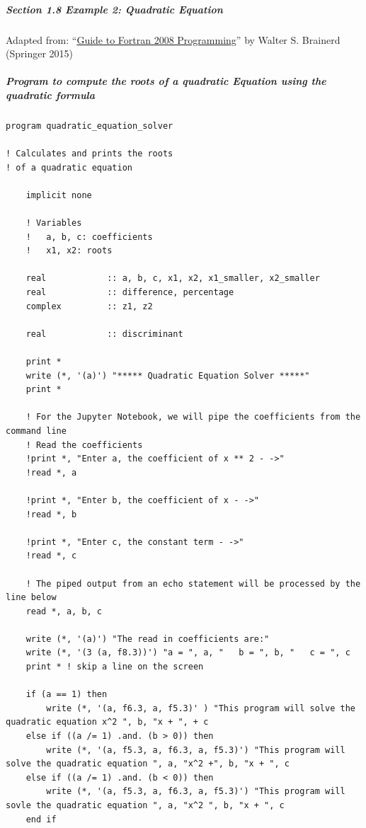 \subparagraph{Section 1.8 Example 2: Quadratic Equation}

Adapted from: ``\href{https://www.amazon.com/Guide-Fortran-Programming-Walter-brainerd/dp/1447167589/ref=sr\_1\_1?crid=JARCJZJ2KJZN\&keywords=guide+to+fortran+2008+programming\&qid=1581908665\&sprefix=guide+to+fortran+2008+programming\%2Caps\%2C189\&sr=8-1}{Guide to Fortran 2008 Programming}'' by Walter S. Brainerd (Springer 2015)

\subparagraph{Program to compute the roots of a quadratic Equation using the quadratic formula}

\begin{verbatim}
program quadratic_equation_solver

! Calculates and prints the roots
! of a quadratic equation

    implicit none

    ! Variables
    !   a, b, c: coefficients
    !   x1, x2: roots

    real            :: a, b, c, x1, x2, x1_smaller, x2_smaller
    real            :: difference, percentage
    complex         :: z1, z2

    real            :: discriminant

    print *
    write (*, '(a)') "***** Quadratic Equation Solver *****"
    print *

    ! For the Jupyter Notebook, we will pipe the coefficients from the command line 
    ! Read the coefficients
    !print *, "Enter a, the coefficient of x ** 2 - ->"
    !read *, a

    !print *, "Enter b, the coefficient of x - ->"
    !read *, b

    !print *, "Enter c, the constant term - ->"
    !read *, c
    
    ! The piped output from an echo statement will be processed by the line below
    read *, a, b, c
    
    write (*, '(a)') "The read in coefficients are:"
    write (*, '(3 (a, f8.3))') "a = ", a, "   b = ", b, "   c = ", c
    print * ! skip a line on the screen

    if (a == 1) then
        write (*, '(a, f6.3, a, f5.3)' ) "This program will solve the quadratic equation x^2 ", b, "x + ", + c
    else if ((a /= 1) .and. (b > 0)) then
        write (*, '(a, f5.3, a, f6.3, a, f5.3)') "This program will solve the quadratic equation ", a, "x^2 +", b, "x + ", c
    else if ((a /= 1) .and. (b < 0)) then
        write (*, '(a, f5.3, a, f6.3, a, f5.3)') "This program will sovle the quadratic equation ", a, "x^2 ", b, "x + ", c
    end if


\end{verbatim}
